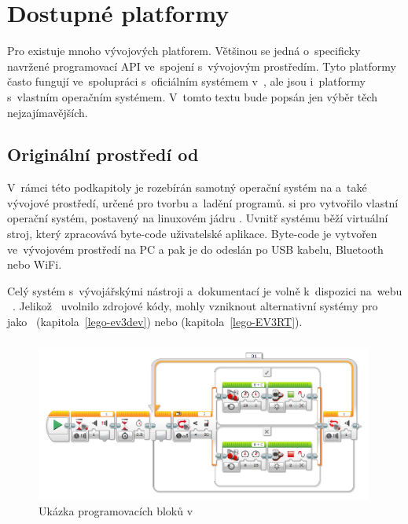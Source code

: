 \chapter{Dostupné platformy}

\label{lego-soft-available-platforms}


Pro \legoEV{} existuje mnoho vývojových platforem. 
Většinou se jedná o~specificky navržené programovací API ve~spojení s~vývojovým prostředím. 
Tyto platformy často fungují ve~spolupráci s~oficiálním systémem v~\EVthree{}, ale jsou i~platformy s~vlastním operačním systémem. 
V~tomto textu bude popsán jen výběr těch nejzajímavějších. %

\section{Originální prostředí od \lego}

V~rámci této podkapitoly je rozebírán samotný operační systém na \EVthree{} a~také vývojové prostředí, určené pro tvorbu a~ladění programů. 
\lego{} si pro \EVthree{} vytvořilo vlastní operační systém, postavený na linuxovém jádru \cite{legoMindstormsEV3_fw-dev-kit}. 
Uvnitř systému běží virtuální stroj, který zpracovává byte-code uživatelské aplikace. 
Byte-code je vytvořen ve~vývojovém prostředí na PC a pak je do  odeslán po USB kabelu, Bluetooth nebo WiFi.

Celý systém s~vývojářskými nástroji a~dokumentací je volně k~dispozici na~webu \lego{}~\cite{legoMindstorms_download}. Jelikož~\lego{} uvolnilo zdrojové kódy, mohly vzniknout alternativní systémy pro~\EVthree{} jako~\evThreeDev{} (kapitola~\ref{lego-ev3dev}) nebo \evRT{} (kapitola~\ref{lego-EV3RT}). 

\subsection{\legoSW{}}
\label{lego-soft-orig-problems}


\begin{figure}[h]
	\centering
	\includegraphics[width=0.99\textwidth]{images/lego-soft_robotut_switch-touch+motors+leds.png}
	\caption{Ukázka programovacích bloků v~\legoSW}
	\label{fig:lego-soft_example-blocks}
\end{figure}


